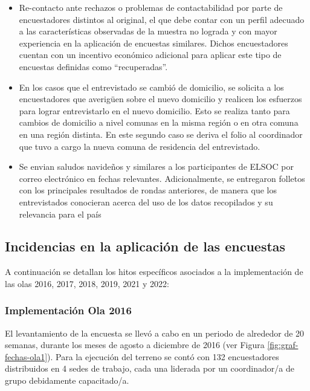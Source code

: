 \documentclass[
  12pt,
]{article}
\begin{document}
\begin{itemize}
\item
  Re-contacto ante rechazos o problemas de contactabilidad por parte de encuestadores distintos al original, el que debe contar con un perfil adecuado a las características observadas de la muestra no lograda y con mayor experiencia en la aplicación de encuestas similares. Dichos encuestadores cuentan con un incentivo económico adicional para aplicar este tipo de encuestas definidas como ``recuperadas''.
\item
  En los casos que el entrevistado se cambió de domicilio, se solicita a los encuestadores que averigüen sobre el nuevo domicilio y realicen los esfuerzos para lograr entrevistarlo en el nuevo domicilio. Esto se realiza tanto para cambios de domicilio a nivel comunas en la misma región o en otra comuna en una región distinta. En este segundo caso se deriva el folio al coordinador que tuvo a cargo la nueva comuna de residencia del entrevistado.
\item
  Se envian saludos navideños y similares a los participantes de ELSOC por correo electrónico en fechas relevantes. Adicionalmente, se entregaron folletos con los principales resultados de rondas anteriores, de manera que los entrevistados conocieran acerca del uso de los datos recopilados y su relevancia para el país
\end{itemize}

\hypertarget{incidencias-en-la-aplicaciuxf3n-de-las-encuestas}{%
\subsection{Incidencias en la aplicación de las encuestas}\label{incidencias-en-la-aplicaciuxf3n-de-las-encuestas}}

A continuación se detallan los hitos específicos asociados a la implementación de las olas 2016, 2017, 2018, 2019, 2021 y 2022:

\hypertarget{implementaciuxf3n-ola-2016}{%
\subsubsection{Implementación Ola 2016}\label{implementaciuxf3n-ola-2016}}

El levantamiento de la encuesta se llevó a cabo en un periodo de alrededor de 20 semanas, durante los meses de agosto a diciembre de 2016 (ver Figura \ref{fig:graf-fechas-ola1}). Para la ejecución del terreno se contó con 132 encuestadores distribuidos en 4 sedes de trabajo, cada una liderada por un coordinador/a de grupo debidamente capacitado/a.
\end{document}
